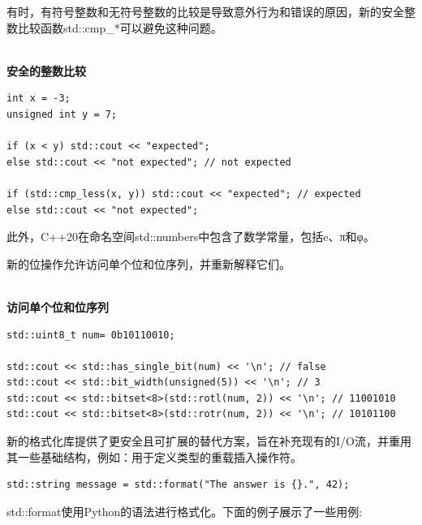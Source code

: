
有时，有符号整数和无符号整数的比较是导致意外行为和错误的原因，新的安全整数比较函数std::cmp\_*可以避免这种问题。

\hspace*{\fill} \\ %
\noindent
\textbf{安全的整数比较}
\begin{lstlisting}[style=styleCXX]
int x = -3;
unsigned int y = 7;

if (x < y) std::cout << "expected";
else std::cout << "not expected"; // not expected

if (std::cmp_less(x, y)) std::cout << "expected"; // expected
else std::cout << "not expected";
\end{lstlisting}

此外，C++20在命名空间std::numbers中包含了数学常量，包括e、π和φ。

新的位操作允许访问单个位和位序列，并重新解释它们。

\hspace*{\fill} \\ %
\noindent
\textbf{访问单个位和位序列}
\begin{lstlisting}[style=styleCXX]
std::uint8_t num= 0b10110010;

std::cout << std::has_single_bit(num) << '\n'; // false
std::cout << std::bit_width(unsigned(5)) << '\n'; // 3
std::cout << std::bitset<8>(std::rotl(num, 2)) << '\n'; // 11001010
std::cout << std::bitset<8>(std::rotr(num, 2)) << '\n'; // 10101100
\end{lstlisting}


新的格式化库提供了更安全且可扩展的替代方案，旨在补充现有的I/O流，并重用其一些基础结构，例如：用于定义类型的重载插入操作符。

\begin{lstlisting}[style=styleCXX]
std::string message = std::format("The answer is {}.", 42);
\end{lstlisting}

std::format使用Python的语法进行格式化。下面的例子展示了一些用例:


